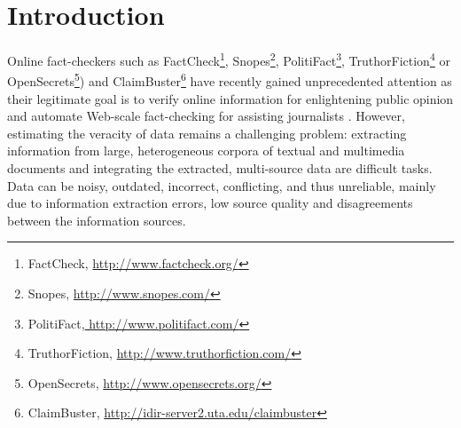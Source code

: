 \section{Introduction}


Online fact-checkers such as FactCheck\footnote{FactCheck, {\small\url{ http://www.factcheck.org/}}}, Snopes\footnote{Snopes, {\small\url{ http://www.snopes.com/}}}, PolitiFact\footnote{PolitiFact,{\small \url{ http://www.politifact.com/}}}, TruthorFiction\footnote{TruthorFiction, {\small\url{ http://www.truthorfiction.com/}}} or OpenSecrets\footnote{OpenSecrets, {\small \url{ http://www.opensecrets.org/}}}) and ClaimBuster\footnote{ClaimBuster, {\small\url{ http://idir-server2.uta.edu/claimbuster}}} 
 have recently gained  unprecedented attention as their legitimate goal is to verify online information for enlightening public opinion and automate Web-scale fact-checking for assisting journalists \citep{Cohen2011,Hassan:2015}.
 However, estimating the veracity of data remains a challenging problem: extracting information from large, heterogeneous corpora of textual and multimedia documents and  integrating the extracted, multi-source data are difficult tasks. Data can be noisy, outdated, incorrect, conflicting, and thus unreliable, mainly due to information extraction errors,  low source quality and disagreements between the information sources. 
 
